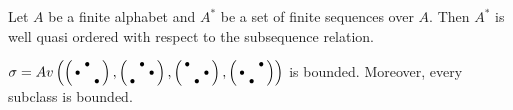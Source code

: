 \begin{fct}
\label{fct:Higman}
Let $A$ be a finite alphabet and $A^*$ be a set of finite sequences over $A$. Then $A^*$ is well quasi ordered with respect to the subsequence relation.
\end{fct}

\begin{thm}
$\sigma=Av\left(\left(\begin{smallmatrix} &\bullet& \\\bullet& & \\ & &\bullet\end{smallmatrix}\right),\left(\begin{smallmatrix} &\bullet& \\ & &\bullet\\\bullet& & \end{smallmatrix}\right),\left(\begin{smallmatrix}\bullet& & \\ & &\bullet\\ &\bullet& \end{smallmatrix}\right),\left(\begin{smallmatrix} & &\bullet\\\bullet& & \\ &\bullet& \end{smallmatrix}\right)\right)$ is bounded. Moreover, every subclass is bounded.
\end{thm}
